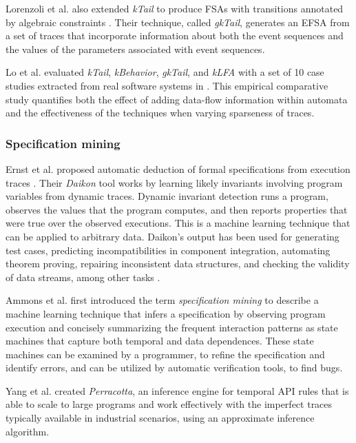 Lorenzoli et al. also extended \textit{kTail} to produce FSAs
with transitions annotated by algebraic constraints
\cite{Lorenzoli2008}. Their technique, called \textit{gkTail},
generates an EFSA from a set of traces that incorporate
information about both the event sequences and the values of the
parameters associated with event sequences.

Lo et al. evaluated \textit{kTail}, \textit{kBehavior},
\textit{gkTail}, and \textit{kLFA} with a set of 10 case studies
extracted from real software systems in \cite{Lo20122063}. This
empirical comparative study quantifies both the effect of adding
data-flow information within automata and the effectiveness of
the techniques when varying sparseness of traces.


\subsubsection{Specification mining}
\label{sec:related:modelinf:passive-spec}

Ernst et al. proposed automatic deduction of formal
specifications from execution traces
\cite{Ernst:1999:DDL:302405.302467}. Their \textit{Daikon} tool
works by learning likely invariants involving program variables
from dynamic traces. Dynamic invariant detection runs a program,
observes the values that the program computes, and then reports
properties that were true over the observed executions. This is a
machine learning technique that can be applied to arbitrary data.
Daikon's output has been used for generating test cases,
predicting incompatibilities in component integration, automating
theorem proving, repairing inconsistent data structures, and
checking the validity of data streams, among other tasks
\cite{Ernst200735}.

Ammons et al. first introduced the term \textit{specification
mining} \cite{Ammons:2002:MS:565816.503275} to describe a machine
learning technique that infers a specification by observing
program execution and concisely summarizing the frequent
interaction patterns as state machines that capture both temporal
and data dependences. These state machines can be examined by a
programmer, to refine the specification and identify errors, and
can be utilized by automatic verification tools, to find bugs.

Yang et al. \cite{Yang:2006:PMT:1134285.1134325} created
\textit{Perracotta}, an inference engine for temporal API rules
that is able to scale to large programs and work effectively with
the imperfect traces typically available in industrial scenarios,
using an approximate inference algorithm.

